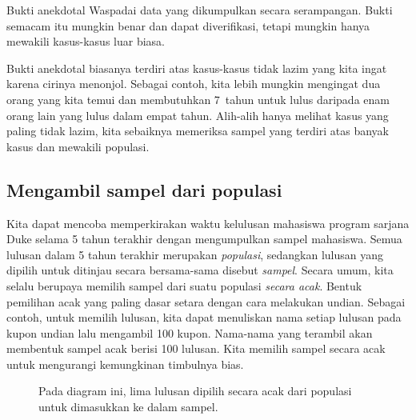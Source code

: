 \begin{onebox}{Bukti anekdotal}
Waspadai data yang dikumpulkan secara serampangan.
Bukti semacam itu mungkin benar dan dapat diverifikasi, tetapi mungkin
hanya mewakili kasus-kasus luar biasa.
\end{onebox}

\D{\newpage}

Bukti anekdotal biasanya terdiri atas kasus-kasus tidak lazim yang kita ingat
karena cirinya menonjol. Sebagai contoh, kita lebih mungkin mengingat dua orang
yang kita temui dan membutuhkan 7~tahun untuk lulus daripada enam orang lain
yang lulus dalam empat tahun. Alih-alih hanya melihat kasus yang paling tidak
lazim, kita sebaiknya memeriksa sampel yang terdiri atas banyak kasus dan
mewakili populasi.

\subsection{Mengambil sampel dari populasi}


Kita dapat mencoba memperkirakan waktu kelulusan mahasiswa program sarjana
Duke selama 5 tahun terakhir dengan mengumpulkan sampel mahasiswa.
Semua lulusan dalam 5 tahun terakhir merupakan
\emph{populasi}, sedangkan lulusan yang dipilih untuk
ditinjau secara bersama-sama disebut
\emph{sampel}.
Secara umum, kita selalu berupaya memilih sampel dari suatu populasi
\emph{secara acak}.
Bentuk pemilihan acak yang paling dasar setara dengan cara melakukan undian.
Sebagai contoh, untuk memilih lulusan, kita dapat menuliskan nama setiap
lulusan pada kupon undian lalu mengambil 100 kupon.
Nama-nama yang terambil akan membentuk sampel acak berisi 100 lulusan.
Kita memilih sampel secara acak untuk mengurangi kemungkinan timbulnya bias.

\begin{figure}[ht]
  \centering
  \caption{Pada diagram ini, lima lulusan dipilih secara acak
      dari populasi untuk dimasukkan ke dalam sampel.}
  \label{popToSampleGraduates}
\end{figure}


